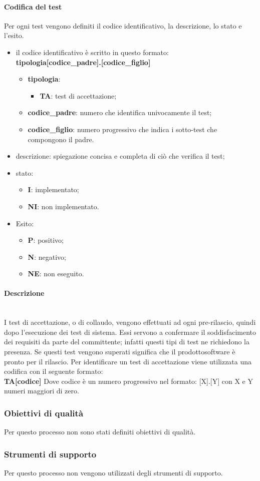 			\paragraph*{Codifica del test}
			Per ogni test vengono definiti il codice identificativo, la descrizione, lo stato e l'esito.
			\begin{itemize}
				\item il codice identificativo è scritto in questo formato:\\
				\textbf{tipologia[codice\_padre].[codice\_figlio]}
				\begin{itemize}
					\item \textbf{tipologia}:
					\begin{itemize}
						\item \textbf{TA}: test di accettazione;
					\end{itemize}
					\item \textbf{codice\_padre}: numero che identifica univocamente il test;
					\item \textbf{codice\_figlio}: numero progressivo che indica i sotto-test che compongono il padre. 
				\end{itemize}
				\item descrizione: spiegazione concisa e completa di ciò che verifica il test;
				\item stato:
				\begin{itemize}
					\item \textbf{I}: implementato;
					\item \textbf{NI}: non implementato.
				\end{itemize}
				\item Esito:
				\begin{itemize}
					\item \textbf{P}: positivo;
					\item \textbf{N}: negativo;
					\item \textbf{NE}: non eseguito.
				\end{itemize}
			\end{itemize}
			\paragraph*{Descrizione} \mbox{}\\ [1mm]
			I test di accettazione, o di collaudo, vengono effettuati ad ogni pre-rilascio, quindi dopo l'esecuzione dei test di sistema. Essi servono a confermare il soddisfacimento dei requisiti da parte del committente; infatti questi tipi di test ne richiedono la presenza. Se questi test vengono superati significa che il prodotto\glosp software è pronto per il rilascio. 
			Per identificare un test di accettazione viene utilizzata una codifica con il seguente formato:\\
			\textbf{TA[codice]}
			Dove codice è un numero progressivo nel formato: [X].[Y] con X e Y numeri maggiori di zero.
	\subsubsection{Obiettivi di qualità}
		Per questo processo non sono stati definiti obiettivi di qualità.
	\subsubsection{Strumenti di supporto}
		Per questo processo non vengono utilizzati degli strumenti di supporto.